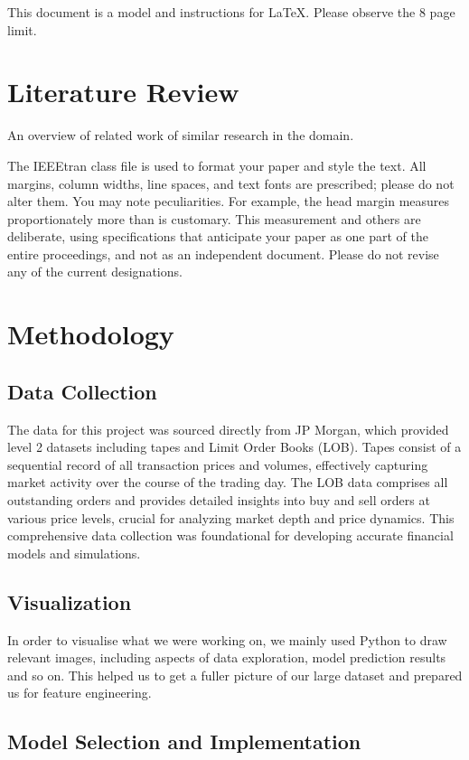 \documentclass[conference]{IEEEtran}
\begin{document}
This document is a model and instructions for \LaTeX.
Please observe the 8 page limit. 

\section{Literature Review}
{\color{blue}An overview of related work of similar research in the domain.}

The IEEEtran class file is used to format your paper and style the text. All margins, 
column widths, line spaces, and text fonts are prescribed; please do not 
alter them. You may note peculiarities. For example, the head margin
measures proportionately more than is customary. This measurement 
and others are deliberate, using specifications that anticipate your paper 
as one part of the entire proceedings, and not as an independent document. 
Please do not revise any of the current designations.

\section{Methodology}
\subsection{Data Collection}

The data for this project was sourced directly from JP Morgan, which provided level 2 datasets including tapes and Limit Order Books (LOB). Tapes consist of a sequential record of all transaction prices and volumes, effectively capturing market activity over the course of the trading day. The LOB data comprises all outstanding orders and provides detailed insights into buy and sell orders at various price levels, crucial for analyzing market depth and price dynamics. This comprehensive data collection was foundational for developing accurate financial models and simulations.

\subsection{Visualization}
In order to visualise what we were working on, we mainly used Python to draw relevant images, including aspects of data exploration, model prediction results and so on. This helped us to get a fuller picture of our large dataset and prepared us for feature engineering.

\subsection{Model Selection and Implementation}
\end{document}

